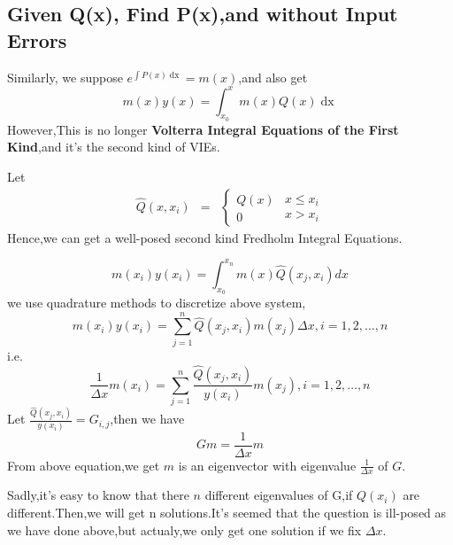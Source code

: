 \documentclass[a4paper]{article}
\newcommand{\tmop}[1]{\ensuremath{\operatorname{#1}}}
\newcommand{\tmstrong}[1]{\textbf{#1}}
\begin{document}
\subsection{Given Q(x), Find P(x),and without Input Errors}

Similarly, we suppose $e^{\int P \left( x \right) \tmop{dx}} = m \left( x
\right)$,and also get
\begin{equation}
  m \left( x \right) y \left( x \right) = \int_{x_0}^x m \left( x \right) Q
  \left( x \right) \tmop{dx}
\end{equation}
However,This is no longer {\tmstrong{Volterra Integral Equations of the First
Kind}},and it's the second kind of VIEs.

Let
\begin{eqnarray}
  \hat{Q} \left( x, x_i \right) & = & \left\{ \begin{array}{l}
    Q \left( x \right) \\
    0
  \end{array} \right. \begin{array}{c}
    x \leqslant x_i\\
    x > x_i
  \end{array}
\end{eqnarray}
Hence,we can get a well-posed second kind Fredholm Integral Equations.


\begin{equation}
  m \left( x_i \right) y \left( x_i \right) = \int_{x_0}^{x_n} m \left( x
  \right) \hat{Q} \left(x_j,x_i \right) d x
\end{equation}
we use quadrature methods to discretize above system,
\begin{equation}
  m \left( x_i \right) y \left( x_i \right) = \sum^n_{j = 1} \hat{Q} \left(
  x_j, x_i \right) m \left( x_j \right) \Delta x, i = 1, 2, \ldots, n
\end{equation}
i.e.
\begin{equation}
  \frac{1}{\Delta x} m \left( x_i \right) = \sum^n_{j = 1} \frac{\hat{Q}
  \left( x_j, x_i \right)}{y \left( x_i \right)} m \left( x_j \right), i = 1,
  2, \ldots, n
\end{equation}
Let $\frac{\hat{Q} \left( x_j, x_i \right)}{y \left( x_i \right)} = G_{i,
j}$,then we have
\begin{equation}
  G m = \frac{1}{\Delta x} m
\end{equation}
From above equation,we get $m$ is an eigenvector with eigenvalue
$\frac{1}{\Delta x}$ of $G$.

Sadly,it's easy to know that there $n$ different eigenvalues of G,if $Q (x_i)$
are different.Then,we will get n solutions.It's seemed that the question is
ill-posed as we have done above,but actualy,we only get one solution if we fix
$\Delta x$.
\end{document}
